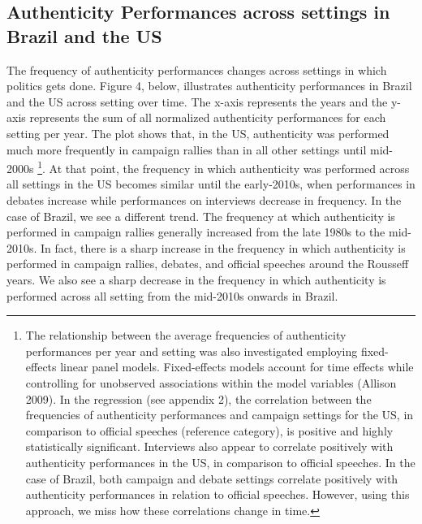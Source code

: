 \documentclass[smallextended]{svjour3}       %
\begin{document}
\hypertarget{authenticity-performances-across-settings-in-brazil-and-the-us}{%
\subsection{Authenticity Performances across settings in Brazil and the
US}\label{authenticity-performances-across-settings-in-brazil-and-the-us}}

The frequency of authenticity performances changes across settings in
which politics gets done. Figure 4, below, illustrates authenticity
performances in Brazil and the US across setting over time. The x-axis
represents the years and the y-axis represents the sum of all normalized
authenticity performances for each setting per year. The plot shows
that, in the US, authenticity was performed much more frequently in
campaign rallies than in all other settings until mid-2000s \footnote{
  The relationship between the average frequencies of authenticity
  performances per year and setting was also investigated employing
  fixed-effects linear panel models. Fixed-effects models account for
  time effects while controlling for unobserved associations within the
  model variables (Allison 2009). In the regression (see appendix 2),
  the correlation between the frequencies of authenticity performances
  and campaign settings for the US, in comparison to official speeches
  (reference category), is positive and highly statistically
  significant. Interviews also appear to correlate positively with
  authenticity performances in the US, in comparison to official
  speeches. In the case of Brazil, both campaign and debate settings
  correlate positively with authenticity performances in relation to
  official speeches. However, using this approach, we miss how these
  correlations change in time.}. At that point, the frequency in which
authenticity was performed across all settings in the US becomes similar
until the early-2010s, when performances in debates increase while
performances on interviews decrease in frequency. In the case of Brazil,
we see a different trend. The frequency at which authenticity is
performed in campaign rallies generally increased from the late 1980s to
the mid-2010s. In fact, there is a sharp increase in the frequency in
which authenticity is performed in campaign rallies, debates, and
official speeches around the Rousseff years. We also see a sharp
decrease in the frequency in which authenticity is performed across all
setting from the mid-2010s onwards in Brazil.
\end{document}
